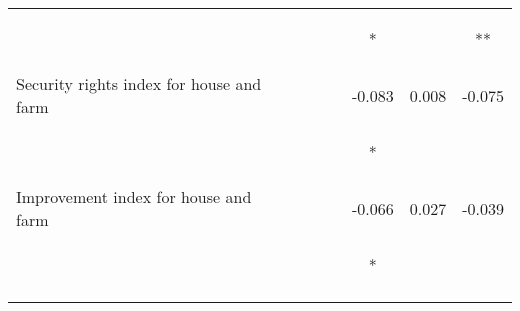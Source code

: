 \begin{tabular}{lcccccc}
 & \begin{footnotesize}[0.013]\end{footnotesize} & \begin{footnotesize}[0.021]\end{footnotesize} & \begin{footnotesize}[0.019]\end{footnotesize} & \begin{footnotesize}[0.007]*\end{footnotesize} & \begin{footnotesize}[0.009]\end{footnotesize} & \begin{footnotesize}[0.007]**\end{footnotesize}\\
\noalign{\smallskip}Security rights index for house and farm &  &  &  & -0.083 & 0.008 & -0.075\\
 & \begin{footnotesize}\end{footnotesize} & \begin{footnotesize}\end{footnotesize} & \begin{footnotesize}\end{footnotesize} & \begin{footnotesize}[0.044]*\end{footnotesize} & \begin{footnotesize}[0.064]\end{footnotesize} & \begin{footnotesize}[0.054]\end{footnotesize}\\
\noalign{\smallskip}Improvement index for house and farm &  &  &  & -0.066 & 0.027 & -0.039\\
 & \begin{footnotesize}\end{footnotesize} & \begin{footnotesize}\end{footnotesize} & \begin{footnotesize}\end{footnotesize} & \begin{footnotesize}[0.039]*\end{footnotesize} & \begin{footnotesize}[0.061]\end{footnotesize} & \begin{footnotesize}[0.056]\end{footnotesize}\\
\noalign{\smallskip}\hline\end{tabular}
